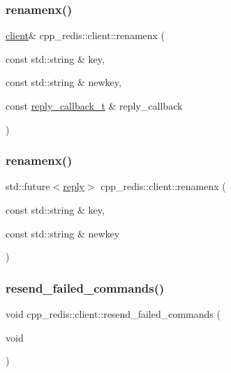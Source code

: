 \subsubsection{\texorpdfstring{renamenx()}{renamenx()}\hspace{0.1cm}{\footnotesize\ttfamily [1/2]}}
{\footnotesize\ttfamily \hyperlink{classcpp__redis_1_1client}{client}\& cpp\+\_\+redis\+::client\+::renamenx (\begin{DoxyParamCaption}\item[{const std\+::string \&}]{key,  }\item[{const std\+::string \&}]{newkey,  }\item[{const \hyperlink{classcpp__redis_1_1client_a061a1140d36d2eaeda82b09a0bb3f9f2}{reply\+\_\+callback\+\_\+t} \&}]{reply\+\_\+callback }\end{DoxyParamCaption})}

\mbox{\label{classcpp__redis_1_1client_a1b5110b73c9561e5b235317fa03ee4bb}} 
\subsubsection{\texorpdfstring{renamenx()}{renamenx()}\hspace{0.1cm}{\footnotesize\ttfamily [2/2]}}
{\footnotesize\ttfamily std\+::future$<$\hyperlink{classcpp__redis_1_1reply}{reply}$>$ cpp\+\_\+redis\+::client\+::renamenx (\begin{DoxyParamCaption}\item[{const std\+::string \&}]{key,  }\item[{const std\+::string \&}]{newkey }\end{DoxyParamCaption})}

\mbox{\label{classcpp__redis_1_1client_a6cf006e4c6e69a00b63cc7e1281d326b}} 
\subsubsection{\texorpdfstring{resend\+\_\+failed\+\_\+commands()}{resend\_failed\_commands()}}
{\footnotesize\ttfamily void cpp\+\_\+redis\+::client\+::resend\+\_\+failed\+\_\+commands (\begin{DoxyParamCaption}\item[{void}]{ }\end{DoxyParamCaption})\hspace{0.3cm}{\ttfamily [private]}}

